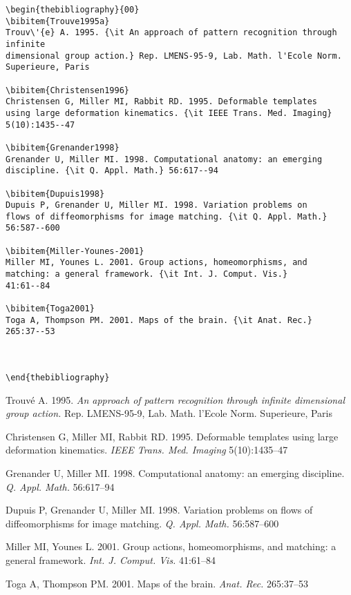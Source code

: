 \documentclass{ar-1col-S2O}
\begin{document}
\begin{verbatim}
\begin{thebibliography}{00}
\bibitem{Trouve1995a}
Trouv\'{e} A. 1995. {\it An approach of pattern recognition through infinite 
dimensional group action.} Rep. LMENS-95-9, Lab. Math. l'Ecole Norm. Superieure, Paris 

\bibitem{Christensen1996}
Christensen G, Miller MI, Rabbit RD. 1995. Deformable templates
using large deformation kinematics. {\it IEEE Trans. Med. Imaging}
5(10):1435--47

\bibitem{Grenander1998}
Grenander U, Miller MI. 1998. Computational anatomy: an emerging
discipline. {\it Q. Appl. Math.} 56:617--94

\bibitem{Dupuis1998}
Dupuis P, Grenander U, Miller MI. 1998. Variation problems on
flows of diffeomorphisms for image matching. {\it Q. Appl. Math.}
56:587--600

\bibitem{Miller-Younes-2001}
Miller MI, Younes L. 2001. Group actions, homeomorphisms, and matching: a general framework. {\it Int. J. Comput. Vis.}
41:61--84

\bibitem{Toga2001}
Toga A, Thompson PM. 2001. Maps of the brain. {\it Anat. Rec.}
265:37--53



\end{thebibliography}
\end{verbatim}




\begin{thebibliography}{00}

Trouv\'{e} A. 1995. {\it An approach of pattern recognition through
infinite dimensional group action.} Rep. LMENS-95-9, Lab. Math. l'Ecole Norm. Superieure, Paris  

Christensen G, Miller MI, Rabbit RD. 1995. Deformable templates
using large deformation kinematics. {\it IEEE Trans. Med. Imaging}
5(10):1435--47

Grenander U, Miller MI. 1998. Computational anatomy: an emerging
discipline. {\it Q. Appl. Math.} 56:617--94

Dupuis P, Grenander U, Miller MI. 1998. Variation problems on
flows of diffeomorphisms for image matching. {\it Q. Appl. Math.}
56:587--600

Miller MI, Younes L. 2001. Group actions, homeomorphisms, and matching: a general framework. {\it Int. J. Comput. Vis.}
41:61--84

Toga A, Thompson PM. 2001. Maps of the brain. {\it Anat. Rec.}
265:37--53



 

\end{thebibliography}
\end{document}
